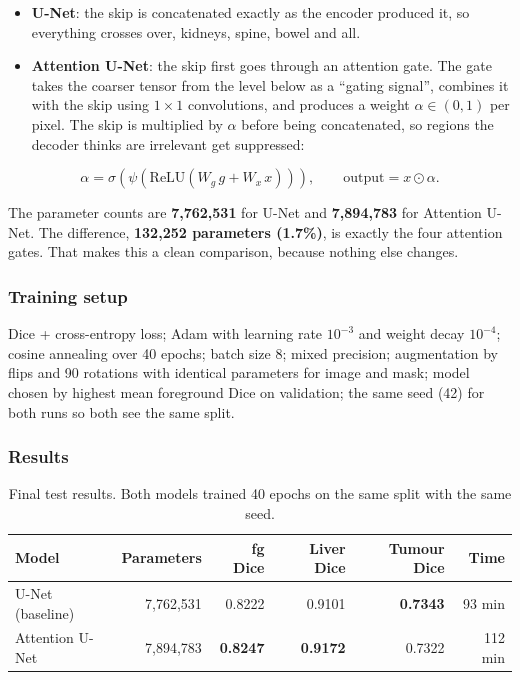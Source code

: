 \documentclass[11pt,a4paper]{article}
\begin{document}
\begin{itemize}
  \item \textbf{U-Net}: the skip is concatenated exactly as the encoder produced
        it, so everything crosses over, kidneys, spine, bowel and all.
  \item \textbf{Attention U-Net}: the skip first goes through an attention gate.
        The gate takes the coarser tensor from the level below as a ``gating
        signal'', combines it with the skip using $1\times1$ convolutions, and
        produces a weight $\alpha \in (0,1)$ per pixel. The skip is multiplied by
        $\alpha$ before being concatenated, so regions the decoder thinks are
        irrelevant get suppressed:
\end{itemize}
\[
\alpha = \sigma\!\left(\psi\!\left(\mathrm{ReLU}\!\left(W_g\,g + W_x\,x\right)\right)\right),
\qquad \text{output} = x \odot \alpha .
\]

The parameter counts are \textbf{7{,}762{,}531} for U-Net and
\textbf{7{,}894{,}783} for Attention U-Net. The difference,
\textbf{132{,}252 parameters (1.7\%)}, is exactly the four attention gates. That
makes this a clean comparison, because nothing else changes.

\subsubsection*{Training setup}

Dice + cross-entropy loss; Adam with learning rate $10^{-3}$ and weight decay
$10^{-4}$; cosine annealing over 40 epochs; batch size 8; mixed precision;
augmentation by flips and 90\textdegree{} rotations with identical parameters for
image and mask; model chosen by highest mean foreground Dice on validation; the
same seed (42) for both runs so both see the same split.

\subsubsection*{Results}

\begin{table}[H]
\centering
\small
\begin{tabular}{lrrrrr}
\toprule
\textbf{Model} & \textbf{Parameters} & \textbf{fg Dice} & \textbf{Liver Dice}
& \textbf{Tumour Dice} & \textbf{Time} \\
\midrule
U-Net (baseline) & 7{,}762{,}531 & 0.8222 & 0.9101 & \textbf{0.7343} & 93 min \\
Attention U-Net  & 7{,}894{,}783 & \textbf{0.8247} & \textbf{0.9172} & 0.7322 & 112 min \\
\bottomrule
\end{tabular}
\caption{Final test results. Both models trained 40 epochs on the same split with
the same seed.}
\label{tab:results}
\end{table}
\end{document}
